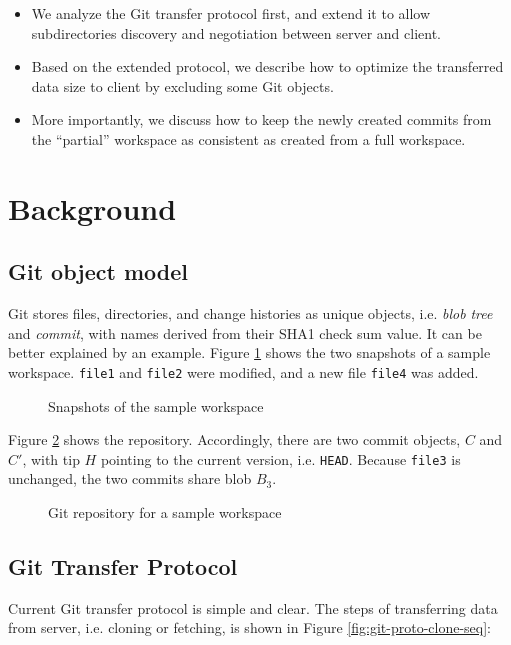 \documentclass[preprint]{sigplanconf}
\begin{document}
\begin{itemize}
  \item We analyze the Git transfer protocol first, and extend it to allow
      subdirectories discovery and negotiation between server and client.
  \item Based on the extended protocol, we describe how to optimize the
      transferred data size to client by excluding some Git objects.
  \item More importantly, we discuss how to keep the newly created commits from
      the ``partial'' workspace as consistent as created from a full workspace.
\end{itemize}

\section{Background}
\subsection{Git object model}
Git stores files, directories, and change histories as unique objects, i.e.
\emph{blob} \emph{tree} and \emph{commit}, with names derived from their SHA1
check sum value\cite{gitobj}.
It can be better explained by an example.
Figure \ref{fig:workspace} shows the two snapshots of a sample workspace.
\verb|file1| and \verb|file2| were modified, and a new file \verb|file4| was
added.
\begin{figure}
  \centering
  
  \caption{Snapshots of the sample workspace}
  \label{fig:workspace}
\end{figure}

Figure \ref{fig:git-repo} shows the repository.
Accordingly, there are two commit objects, $C$ and $C'$, with tip $H$ pointing
to the current version, i.e. \verb|HEAD|.
Because \verb|file3| is unchanged, the two commits share blob $B_3$.

\begin{figure}[htpb]
  \centering
  
  \caption{Git repository for a sample workspace}
  \label{fig:git-repo}
\end{figure}

\subsection{Git Transfer Protocol}
Current Git transfer protocol is simple and clear\cite{tran-protocol}.
The steps of transferring data from server, i.e. cloning or fetching, is shown in Figure \ref{fig:git-proto-clone-seq}:
\end{document}
